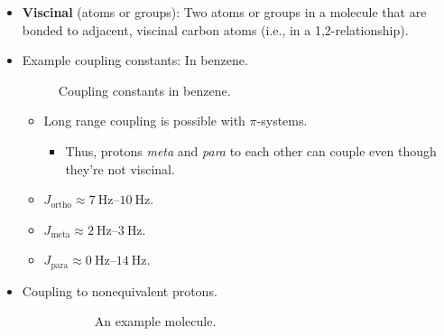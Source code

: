 \documentclass[../notes.tex]{subfiles}
\begin{document}
\begin{itemize}
    \item \textbf{Viscinal} (atoms or groups): Two atoms or groups in a molecule that are bonded to adjacent, viscinal carbon atoms (i.e., in a 1,2-relationship).
    \item Example coupling constants: In benzene.
    \begin{figure}[H]
        \centering
        \footnotesize
        \caption{Coupling constants in benzene.}
        \label{fig:couplingBenz}
    \end{figure}
    \begin{itemize}
        \item Long range coupling is possible with $\pi$-systems.
        \begin{itemize}
            \item Thus, protons \emph{meta} and \emph{para} to each other can couple even though they're not viscinal.
        \end{itemize}
        \item $J_\text{ortho}\approx\SIrange{7}{10}{\hertz}$.
        \item $J_\text{meta}\approx\SIrange{2}{3}{\hertz}$.
        \item $J_\text{para}\approx\SIrange{0}{14}{\hertz}$.
    \end{itemize}
    \item Coupling to nonequivalent protons.
    \begin{figure}[h!]
        \centering
        \begin{subfigure}[b]{0.4\linewidth}
            \centering
            \footnotesize
            \caption{An example molecule.}
            \label{fig:couplingNonequiva}
        \end{subfigure}
        \begin{subfigure}[b]{0.4\linewidth}
            \centering
\end{subfigure}
\end{figure}
\end{itemize}
\end{document}
